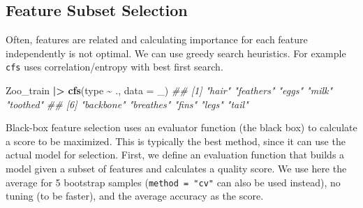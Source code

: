 \documentclass[
  notitlepage]{book}
\newenvironment{Shaded}{\begin{snugshade}}{\end{snugshade}}
\newcommand{\CommentTok}[1]{\textcolor[rgb]{0.56,0.35,0.01}{\textit{#1}}}
\newcommand{\DataTypeTok}[1]{\textcolor[rgb]{0.13,0.29,0.53}{#1}}
\newcommand{\ErrorTok}[1]{\textcolor[rgb]{0.64,0.00,0.00}{\textbf{#1}}}
\newcommand{\KeywordTok}[1]{\textcolor[rgb]{0.13,0.29,0.53}{\textbf{#1}}}
\newcommand{\NormalTok}[1]{#1}
\newcommand{\OperatorTok}[1]{\textcolor[rgb]{0.81,0.36,0.00}{\textbf{#1}}}
\newcommand{\StringTok}[1]{\textcolor[rgb]{0.31,0.60,0.02}{#1}}
\begin{document}
\hypertarget{feature-subset-selection-1}{%
\subsection{Feature Subset Selection}\label{feature-subset-selection-1}}

Often, features are related and calculating importance for each feature
independently is not optimal. We can use greedy search heuristics. For
example \texttt{cfs} uses correlation/entropy with best first search.

\begin{Shaded}
\begin{Highlighting}[]
\NormalTok{Zoo\_train }\OperatorTok{|}\ErrorTok{\textgreater{}}\StringTok{ }
\StringTok{  }\KeywordTok{cfs}\NormalTok{(type }\OperatorTok{\textasciitilde{}}\StringTok{ }\NormalTok{., }\DataTypeTok{data =}\NormalTok{ \_)}
\CommentTok{\#\#  [1] "hair"     "feathers" "eggs"     "milk"     "toothed" }
\CommentTok{\#\#  [6] "backbone" "breathes" "fins"     "legs"     "tail"}
\end{Highlighting}
\end{Shaded}

Black-box feature selection uses an evaluator function (the black box)
to calculate a score to be maximized.
This is typically the best method, since it can use the actual model
for selection.
First, we define an evaluation
function that builds a model given a subset of features and calculates a
quality score. We use here the average for 5 bootstrap samples
(\texttt{method\ =\ "cv"} can also be used instead), no tuning (to be faster),
and the average accuracy as the score.
\end{document}
